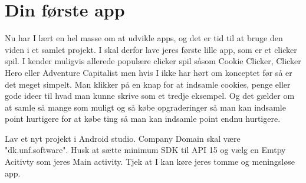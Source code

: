 \chapter{Din første app}

Nu har I lært en hel masse om at udvikle apps, og det er tid til at bruge den viden i et samlet projekt. I skal derfor lave jeres første lille app, som er et clicker spil. I kender muligvis allerede populære clicker spil såsom Cookie Clicker, Clicker Hero eller Adventure Capitalist men hvis I ikke har hørt om konceptet før så er det meget simpelt. Man klikker på en knap for at indsamle cookies, penge eller gode ideer til hvad man kunne skrive som et tredje eksempel. Og det gælder om at samle så mange som muligt og så købe opgraderinger så man kan indsamle point hurtigere for at købe ting så man kan indsamle point endnu hurtigere.

\begin{exercise}
	Lav et nyt projekt i Android studio. Company Domain skal være "dk.unf.software". Husk at sætte minimum SDK til API 15 og vælg en Emtpy Acitivty som jeres Main activity.
	Tjek at I kan køre jeres tomme og meningsløse app.
\end{exercise}

